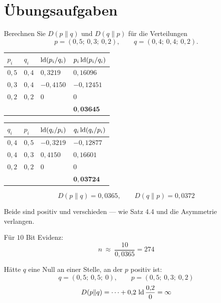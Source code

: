 \section{Übungsaufgaben}

\begin{aufgabe}
Berechnen Sie $D(p\|q)$ und $D(q\|p)$ für die Verteilungen
\[ p = (0{,}5;\ 0{,}3;\ 0{,}2), \qquad q = (0{,}4;\ 0{,}4;\ 0{,}2) . \]

\loesung
{}
\begin{center}
{\small
\renewcommand{\arraystretch}{1.48}
\begin{tabular}{@{}P{1.4cm}P{1.4cm}P{1.8cm}P{2.4cm}@{}}
\toprule
$p_i$ & $q_i$ & $\operatorname{ld}(p_i/q_i)$ & $p_i\operatorname{ld}(p_i/q_i)$\\
\midrule
$0{,}5$ & $0{,}4$ & $0{,}3219$ & $0{,}16096$\\
$0{,}3$ & $0{,}4$ & $-0{,}4150$ & $-0{,}12451$\\
$0{,}2$ & $0{,}2$ & $0$ & $0$\\
\midrule
& & & $\mathbf{0{,}03645}$\\
\bottomrule
\end{tabular}}
\end{center}

\begin{center}
{\small
\renewcommand{\arraystretch}{1.48}
\begin{tabular}{@{}P{1.4cm}P{1.4cm}P{1.8cm}P{2.4cm}@{}}
\toprule
$q_i$ & $p_i$ & $\operatorname{ld}(q_i/p_i)$ & $q_i\operatorname{ld}(q_i/p_i)$\\
\midrule
$0{,}4$ & $0{,}5$ & $-0{,}3219$ & $-0{,}12877$\\
$0{,}4$ & $0{,}3$ & $0{,}4150$ & $0{,}16601$\\
$0{,}2$ & $0{,}2$ & $0$ & $0$\\
\midrule
& & & $\mathbf{0{,}03724}$\\
\bottomrule
\end{tabular}}
\end{center}

\[ D(p\|q) = 0{,}0365, \qquad D(q\|p) = 0{,}0372 \]

Beide sind positiv und verschieden --- wie Satz 4.4 und die Asymmetrie verlangen.

Für $10$ Bit Evidenz:
\[ n \ \approx\ \frac{10}{0{,}0365} = 274 \]

Hätte $q$ eine Null an einer Stelle, an der $p$ positiv ist:
\[ q = (0{,}5;\ 0{,}5;\ 0), \qquad p = (0{,}5;\ 0{,}3;\ 0{,}2) \]
\[ D(p\|q) = \cdots + 0{,}2\,\operatorname{ld}\frac{0{,}2}{0} = \infty \]


\end{aufgabe}
